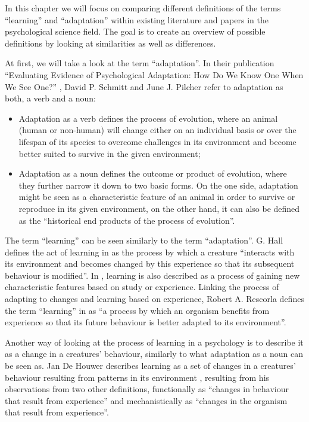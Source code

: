 \documentclass[conference]{IEEEtran}
\begin{document}
	In this chapter we will focus on comparing different definitions of the terms “learning” and “adaptation” within existing literature and papers in the psychological science field. The goal is to create an overview of possible definitions by looking at similarities as well as differences.

	At first, we will take a look at the term “adaptation”. In their publication “Evaluating Evidence of Psychological Adaptation: How Do We Know One When We See One?” \cite{b1}, David P. Schmitt and June J. Pilcher refer to adaptation as both, a verb and a noun:
	\begin{itemize}
		\item Adaptation as a verb defines the process of evolution, where an animal (human or non-human) will change either on an individual basis or over the lifespan of its species to overcome challenges in its environment and become better suited to survive in the given environment;
		\item Adaptation as a noun defines the outcome or product of evolution, where they further narrow it down to two basic forms. On the one side, adaptation might be seen as a characteristic feature of an animal in order to survive or reproduce in its given environment, on the other hand, it can also be defined as the “historical end products of the process of evolution”.
	\end{itemize}

	The term “learning” can be seen similarly to the term “adaptation”. G. Hall defines the act of learning in \cite{b2} as the process by which a creature “interacts with its environment and becomes changed by this experience so that its subsequent behaviour is modified”. In \cite{b3}, learning is also described as a process of gaining new characteristic features based on study or experience. Linking the process of adapting to changes and learning based on experience, Robert A. Rescorla defines the term “learning” in \cite{b4} as “a process by which an organism benefits from experience so that its future behaviour is better adapted to its environment”.

	Another way of looking at the process of learning in a psychology is to describe it as a change in a creatures' behaviour, similarly to what adaptation as a noun can be seen as. Jan De Houwer describes learning as a set of changes in a creatures' behaviour resulting from patterns in its environment \cite{b5}, resulting from his observations from two other definitions, functionally as “changes in behaviour that result from experience” and mechanistically as “changes in the organism that result from experience”.
\end{document}
